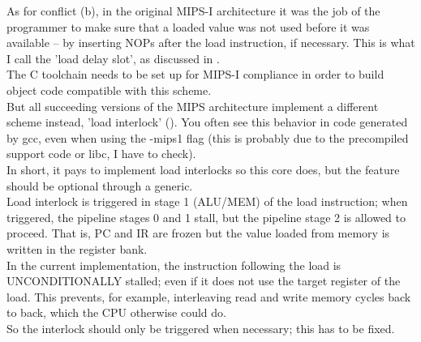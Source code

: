 \documentclass[11pt]{article}
\begin{document}
    As for conflict (b), in the original MIPS-I architecture it was the job
    of the programmer to make sure that a loaded value was not used before it
    was available -- by inserting NOPs after the load instruction, if necessary.
    This is what I call the 'load delay slot', as discussed in \cite[p.~13-1]{r3k_ref_man}.\\
    
    The C toolchain needs to be set up for MIPS-I compliance in order to build
    object code compatible with this scheme.\\
    But all succeeding versions of the MIPS architecture implement a 
    different scheme instead, 'load interlock' (\cite[p.~28]{see_mips_run}). You often see
    this behavior in code generated by gcc, even when using the -mips1 flag (this 
    is probably due to the precompiled support code or libc, I have to check).\\
    In short, it pays to implement load interlocks so this core does, but the
    feature should be optional through a generic.\\
    
    
    Load interlock is triggered in stage 1 (ALU/MEM) of the load instruction;
    when triggered, the pipeline stages 0 and 1 stall, but the pipeline stage
    2 is allowed to proceed. That is, PC and IR are frozen but the value loaded
    from memory is written in the register bank.\\
    
    In the current implementation, the instruction following the load is 
    UNCONDITIONALLY stalled; even if it does not use the target register of the 
    load. This prevents, for example, interleaving read and write memory cycles
    back to back, which the CPU otherwise could do.\\
    So the interlock should only be triggered when necessary; this has to be
    fixed.\\
\end{document}
